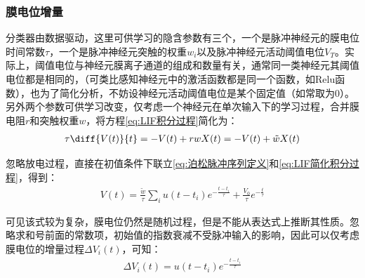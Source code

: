 \documentclass[11pt]{article}
\begin{document}
\subsubsection{膜电位增量}
分类器由数据驱动，这里可供学习的隐含参数有三个，一个是脉冲神经元的膜电位时间常数$\tau$，一个是脉冲神经元突触的权重$w_i$以及脉冲神经元活动阈值电位$V_T$。实际上，阈值电位与神经元膜离子通道的组成和数量有关，通常同一类神经元其阈值电位都是相同的，（可类比感知神经元中的激活函数都是同一个函数，如Relu函数），也为了简化分析，不妨设神经元活动阈值电位是某个固定值（如常取为0）。另外两个参数可供学习改变，仅考虑一个神经元在单次输入下的学习过程，合并膜电阻$r$和突触权重$w$，将方程\ref{eq:LIF积分过程}简化为：
\begin{align}
  \tau\diff{V(t)}{t}=-V(t)+rwX(t)=-V(t)+\tilde{w}X(t)
  \label{eq:LIF简化积分过程}
\end{align}\par
忽略放电过程，直接在初值条件下联立\ref{eq:泊松脉冲序列定义}和\ref{eq:LIF简化积分过程}，得到：
\begin{align}
  V(t)=\frac{\tilde{w}}{\tau}\sum\limits_{i}u(t-t_i)e^{-\frac{t-t_i}{\tau}}+\frac{V_0}{\tau}e^{-\frac{t}{\tau}}
  \label{eq:LIF膜电位公式}
\end{align}\par
可见该式较为复杂，膜电位仍然是随机过程，但是不能从表达式上推断其性质。忽略求和号前面的常数项，初始值的指数衰减不受脉冲输入的影响，因此可以仅考虑膜电位的增量过程$\Delta V_i(t)$，可知：
\begin{align}
  \Delta V_i(t)=u(t-t_i)e^{-\frac{t-t_i}{\tau}}
  \label{eq:不考虑放电的膜电位增量}
\end{align}\par
\end{document}
